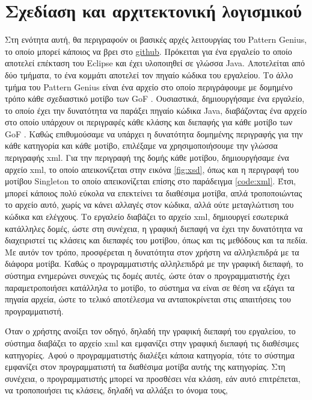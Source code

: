 \chapter{Σχεδίαση και αρχιτεκτονική λογισμικού}
\label{ch:architecture}
Στη ενότητα αυτή, θα περιγραφούν οι βασικές αρχές λειτουργίας του Pattern Genius, το οποίο μπορεί κάποιος να βρει 
στο \href{https://github.com/tasakos-dev/Design-pattern-builder}{\color{blue}\underline{github}}. 
Πρόκειται για ένα εργαλείο το οποίο αποτελεί επέκταση του Eclipse και έχει υλοποιηθεί σε γλώσσα Java. 
Αποτελείται από δύο τμήματα, το ένα κομμάτι αποτελεί τον πηγαίο κώδικα του εργαλείου. Το άλλο τμήμα του Pattern Genius είναι 
ένα αρχείο στο οποίο περιγράφουμε με δομημένο τρόπο κάθε σχεδιαστικό μοτίβο των GoF \cite{GoF}. Ουσιαστικά, δημιουργήσαμε ένα εργαλείο, 
το οποίο έχει την δυνατότητα να παράξει πηγαίο κώδικα Java, διαβάζοντας ένα αρχείο στο οποίο υπάρχουν οι περιγραφές 
κάθε κλάσης και διεπαφής για κάθε μοτίβο των GoF \cite{GoF}. Καθώς επιθυμούσαμε να υπάρχει η δυνατότητα δομημένης περιγραφής 
για την κάθε κατηγορία και κάθε μοτίβο, επιλέξαμε να χρησιμοποιήσουμε την γλώσσα περιγραφής xml. Για την περιγραφή της δομής κάθε μοτίβου, 
δημιουργήσαμε ένα αρχείο xml, το οποίο απεικονίζεται στην εικόνα \ref{fig:xsd}, όπως και η περιγραφή του μοτίβου Singleton \cite{GoF} 
το οποίο απεικονίζεται επίσης στο παράδειγμα \ref{code:xml}. Έτσι, μπορεί κάποιος πολύ εύκολα να επεκτείνει τα διαθέσιμα μοτίβα, 
απλά τροποποιώντας το αρχείο αυτό, χωρίς να κάνει αλλαγές στον κώδικα, αλλά ούτε μεταγλώττιση του κώδικα και ελέγχους. 
Το εργαλείο διαβάζει το αρχείο xml, δημιουργεί εσωτερικά κατάλληλες δομές, ώστε στη συνέχεια, η γραφική διεπαφή 
να έχει την δυνατότητα να διαχειριστεί τις κλάσεις και διεπαφές του μοτίβου, όπως και τις μεθόδους και τα πεδία. 
Με αυτόν τον τρόπο, προσφέρεται η δυνατότητα στον χρήστη να αλληλεπιδρά με τα διάφορα μοτίβα. 
Καθώς ο προγραμματιστής αλληλεπιδρά με την γραφική διεπαφή, το σύστημα ενημερώνει συνεχώς τις δομές αυτές, 
ώστε όταν ο προγραμματιστής έχει παραμετροποιήσει κατάλληλα το μοτίβο, το σύστημα να είναι σε θέση να εξάγει τα πηγαία αρχεία, 
ώστε το τελικό αποτέλεσμα να ανταποκρίνεται στις απαιτήσεις του προγραμματιστή.
\par
Όταν ο χρήστης ανοίξει τον οδηγό, δηλαδή την γραφική διεπαφή του εργαλείου, το σύστημα διαβάζει το αρχείο xml 
και εμφανίζει στην γραφική διεπαφή τις διαθέσιμες κατηγορίες. Αφού ο προγραμματιστής διαλέξει κάποια κατηγορία, 
τότε το σύστημα εμφανίζει στον προγραμματιστή τα διαθέσιμα μοτίβα αυτής της κατηγορίας. Στη συνέχεια, 
ο προγραμματιστής μπορεί να προσθέσει νέα κλάση, εάν αυτό επιτρέπεται, να τροποποιήσει τις κλάσεις, δηλαδή να αλλάξει το όνομα τους, 
